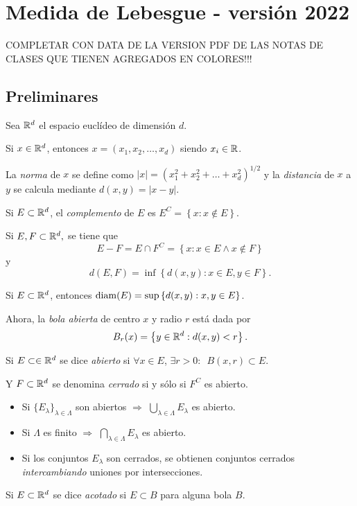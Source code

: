 \chapter{Medida de Lebesgue -  versi\'on 2022}

COMPLETAR CON DATA DE LA  VERSION PDF DE LAS NOTAS DE CLASES QUE TIENEN
 AGREGADOS EN COLORES!!!


\section{Preliminares}
Sea $\mathbb{R}^d$ el espacio eucl\'ideo de dimensi\'on $d$. 

Si $x \in \mathbb{R}^d$, entonces $x=(x_1,x_2,\ldots,x_d)$ siendo $x_i\in \mathbb{R}$.

La \emph{norma} de $x$ se define como $|x|=\left(x_1^2+x_2^2+\ldots+x_d^2\right)^{1/2}$ y la \emph{distancia} de $x$ a $y$
se calcula mediante $d(x,y)=|x-y|$.

Si $E\subset \mathbb{R}^d$, el \emph{complemento} de $E$ es 
$E^C=\left\{ x:x\notin E\right\}$.

Si $E,F\subset \mathbb{R}^d,$ se tiene que 
$$E-F=E\cap F^C=\left\{x: x\in E \wedge x \notin F\right\}$$ y 
$$d(E,F)=\inf \left\{d(x,y):x\in E, y \in F \right\}.$$

Si $E \subset \mathbb{R}^d$, entonces $\operatorname{diam}(E)=\sup\left\{ d(x,y): x,y \in E \right\}$.

Ahora, la \emph{bola abierta} de centro $x$ y radio $r$ est\'a dada por \[B_r(x)=\left\{y \in \mathbb{R}^d: d(x,y)<r  \right\}.\]

Si $E \subset \in \mathbb{R}^d$ se dice \emph{abierto} si $\forall x \in E$, $\exists r>0:$\, $B(x,r)\subset E$. 

Y $F \subset \mathbb{R}^d$ se denomina \emph{cerrado} si y s\'olo si $F^C$ es abierto.

\begin{itemize}
    \item Si $\{E_{\lambda}\}_{\lambda \in \Lambda}$ son abiertos $\Rightarrow$ $ \bigcup\limits_{\lambda \in \Lambda} E_{\lambda}$ 
    es abierto. 
    \item Si $\Lambda$ es finito $\Rightarrow$ $ \bigcap\limits_{\lambda \in \Lambda} E_{\lambda}$ es abierto.
    \item Si los conjuntos $E_{\lambda}$ son cerrados, se obtienen conjuntos cerrados \emph{intercambiando} uniones por intersecciones.
\end{itemize}

Si $E \subset \mathbb{R}^d$ se dice \emph{acotado} si $E\subset B$ para alguna bola $B$.


